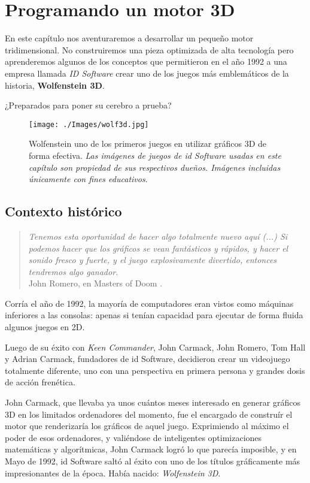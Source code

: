 \chapter{Programando un motor 3D}
\label{chap:motor-3d}

En este capítulo nos aventuraremos a desarrollar un pequeño motor tridimensional. No construiremos una pieza optimizada de alta tecnología pero aprenderemos algunos de los conceptos que permitieron en el año 1992 a una empresa llamada \emph{ID Software} crear uno de los juegos más emblemáticos de la historia, \textbf{Wolfenstein 3D}.

¿Preparados para poner su cerebro a prueba?

\begin{figure}[h!]
	\centering
	\texttt{[image: ./Images/wolf3d.jpg]}
	\caption{Wolfenstein uno de los primeros juegos en utilizar gráficos 3D de forma efectiva. \emph{Las imágenes de juegos de id Software usadas en este capítulo son propiedad de sus respectivos dueños. Imágenes incluidas únicamente con fines educativos}.}
	\label{wolf3d}
\end{figure}

\section{Contexto histórico}

\begin{quote}
\emph{Tenemos esta oportunidad de hacer algo totalmente nuevo aquí (...) Si podemos hacer que los gráficos se vean fantásticos y rápidos, y hacer el sonido fresco y fuerte, y el juego explosivamente divertido, entonces tendremos algo ganador.} \\
John Romero, en Masters of Doom \cite[p.~92]{doom}.
\end{quote}



Corría el año de 1992, la mayoría de computadores eran vistos como máquinas inferiores a las consolas: apenas si tenían capacidad para ejecutar de forma fluida algunos juegos en 2D.

Luego de su éxito con \emph{Keen Commander}, John Carmack, John Romero, Tom Hall y Adrian Carmack, fundadores de id Software, decidieron crear un videojuego totalmente diferente, uno con una perspectiva en primera persona y grandes dosis de acción frenética.

John Carmack, que llevaba ya unos cuántos meses interesado en generar gráficos 3D en los limitados ordenadores del momento, fue el encargado de construír el motor que renderizaría los gráficos de aquel juego. Exprimiendo al máximo el poder de esos ordenadores, y valiéndose de inteligentes optimizaciones matemáticas y algorítmicas, John Carmack logró lo que parecía imposible, y en Mayo de 1992, id Software saltó al éxito con uno de los títulos gráficamente más impresionantes de la época. Había nacido: \emph{Wolfenstein 3D}.

